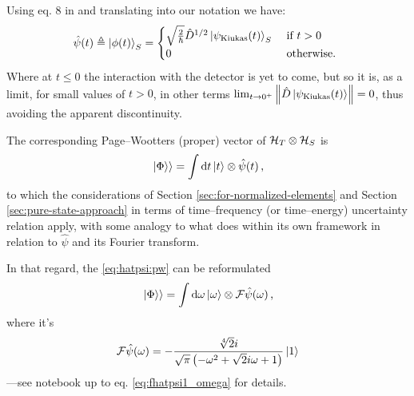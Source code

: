 \citereset
Using eq. 8 in \cite{RuschhauptAbsorption} and translating into our notation we have:
\begin{equation}\label{eq:phi_psi_kiukas}
  \hat{\psi}(t) \triangleq
  \ket{\phi(t)}_S =
  \begin{cases}
    \sqrt{\frac{2}{\hbar}} \hat{D}^{1/2} \ket{\psi_{\text{Kiukas}}(t)}_S &\text{ if } t > 0 \\
    0 &\text{ otherwise. }
  \end{cases}
\end{equation}
Where at $t \le 0$ the interaction with the detector is yet to come,
but so it is, as a limit, for small values of $t>0$,
in other terms
$\lim_{t \to 0^{+}} \norm{\hat{D} \ket{\psi_{\text{Kiukas}}(t)}} = 0$, thus avoiding the apparent discontinuity.

The corresponding Page--Wootters (proper) vector of $\mathcal{H}_T \otimes \mathcal{H}_S$ is
\begin{equation}\label{eq:hatpsi:pw}
  \left.\left| \Phi \right\rangle\right\rangle = \int \dd{t} \ket{t} \otimes \hat{\psi}(t) \,\text{,}
\end{equation}
to which the considerations of Section \ref{sec:for-normalized-elements}
and Section \ref{sec:pure-state-approach} in terms of time--frequency
(or time--energy) uncertainty relation apply, with some analogy
to what \cite{RuschhauptAbsorption} does within its own framework
in relation to $\hat{\psi}$ and its Fourier transform.

In that regard, the \eqref{eq:hatpsi:pw} can be reformulated
\begin{equation}
  \left.\left| \Phi \right\rangle\right\rangle = \int \dd{\omega} \ket{\omega} \otimes \mathcal{F} \hat{\psi} (\omega) \,\text{,}
\end{equation}
where it's
\begin{equation}
  \mathcal{F} \hat{\psi} (\omega) = - \frac{\sqrt[4]{2} i}{\sqrt{\pi} \left(- \omega^{2} + \sqrt{2} i \omega + 1\right)} \ket{1}
\end{equation}
---see notebook up to eq. \eqref{eq:fhatpsi1_omega} for details.






